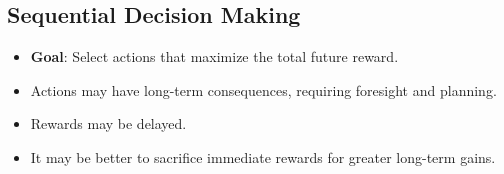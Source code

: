 
\subsection{Sequential Decision Making}
\begin{itemize}
    \item \textbf{Goal}: Select actions that maximize the total future reward.
    \item Actions may have long-term consequences, requiring foresight and planning.
    \item Rewards may be delayed.
    \item It may be better to sacrifice immediate rewards for greater long-term gains.
\end{itemize}


